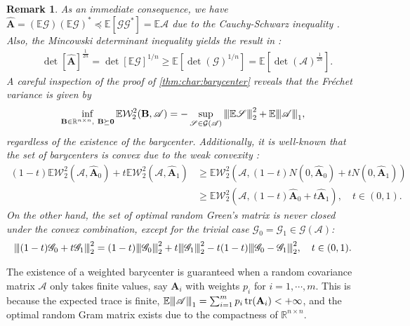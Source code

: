 \documentclass[noinfoline]{imsart}\setcounter{tocdepth}{2}
\renewcommand{\b}[1]{\mathbb{#1}} %
\newcommand{\m}[1]{\mathbf{#1}} %
\newcommand{\s}[1]{\mathscr{#1}} %
\renewcommand{\c}[1]{\mathcal{#1}} %
\DeclareMathOperator*{\tr}{tr}
\newcommand{\vertiii}[1]{{\left\vert\kern-0.25ex\left\vert\kern-0.25ex\left\vert #1 
    \right\vert\kern-0.25ex\right\vert\kern-0.25ex\right\vert}} %
\newcommand{\vertii}[1]{{\vert\kern-0.25ex\vert\kern-0.25ex\vert #1 
    \vert\kern-0.25ex\vert\kern-0.25ex\vert}} %
\theoremstyle{plain}
\newtheorem{remark}{Remark}[section]
\begin{document}
\begin{remark}\label{rmk:inf:bary:loss}
As an immediate consequence, we have $\hat{\m{A}} = (\b{E} \s{G}) (\b{E} \s{G})^{*} \preceq \b{E}[\s{G} \s{G}^{*}] = \b{E} \s{A}$ due to the Cauchy-Schwarz inequality \cite{bhatia2019bures}. Also, the Mincowski determinant inequality yields the result in \cite{agueh2011barycenters}:
\begin{align*}
    &\det[\hat{\m{A}}]^{\frac{1}{2n}} = \det [\b{E} \s{G}]^{1/n} \ge \b{E}[\det (\s{G})^{1/n}] = \b{E}[\det (\s{A})^{\frac{1}{2n}}].
\end{align*}
A careful inspection of the proof of \cref{thm:char:barycenter} reveals that the Fr\'{e}chet variance is given by
\begin{equation*}
    \inf_{\m{B} \in \b{R}^{n \times n}, \ \m{B} \succeq \m{0}}  \b{E} \c{W}_{2}^{2}(\m{B}, \s{A}) %
    = - \sup_{\s{S} \in \c{G}(\s{A})} \vertii{\b{E} \s{S}}_{2}^{2} + \b{E} \vertii{\s{A}}_{1},
\end{equation*}
regardless of the existence of the barycenter. 
Additionally, it is well-known that the set of barycenters is convex due to the weak convexity \cite{panaretos2020invitation,alvarez2011uniqueness}:
\begin{align*}
    (1-t) \b{E} \c{W}_{2}^{2}(\s{A}, \hat{\m{A}}_{0}) + t \b{E} \c{W}_{2}^{2}(\s{A}, \hat{\m{A}}_{1}) &\ge \b{E} \c{W}_{2}^{2}(\s{A}, (1-t) N(0,\hat{\m{A}}_{0}) + t N(0,\hat{\m{A}}_{1})) \\
    &\ge \b{E} \c{W}_{2}^{2}(\s{A}, (1-t) \hat{\m{A}}_{0} + t \hat{\m{A}}_{1}), \quad t \in (0, 1).
\end{align*}
On the other hand, the set of optimal random Green's matrix is never closed under the convex combination, except for the trivial case $\s{G}_{0} = \s{G}_{1} \in \c{G}(\s{A})$:
\begin{align*}
    \vertii{(1-t) \s{G}_{0} + t \s{G}_{1}}_{2}^{2} = (1-t) \vertii{\s{G}_{0}}_{2}^{2} + t \vertii{\s{G}_{1}}_{2}^{2} - t(1-t) \vertii{\s{G}_{0} - \s{G}_{1}}_{2}^{2}, \quad t \in (0, 1).
\end{align*}
\end{remark}

The existence of a weighted barycenter is guaranteed when a random covariance matrix $\s{A}$ only takes finite values, say $\m{A}_{i}$ with weights $p_{i}$ for $i= 1, \cdots, m$. This is because the expected trace is finite, $\b{E} \vertiii{\s{A}}_{1} = \sum_{i=1}^{m} p_{i} \tr (\m{A}_{i}) < +\infty$, and the optimal random Gram matrix exists due to the compactness of $\b{R}^{n \times n}$. 
\end{document}
